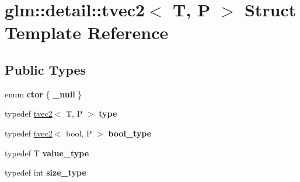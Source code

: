 \hypertarget{structglm_1_1detail_1_1tvec2}{\section{glm\-:\-:detail\-:\-:tvec2$<$ T, P $>$ Struct Template Reference}
\label{structglm_1_1detail_1_1tvec2}
}
\subsection*{Public Types}
\begin{DoxyCompactItemize}
\item 
enum {\bfseries ctor} \{ {\bfseries \-\_\-null}
 \}
\item 
\hypertarget{structglm_1_1detail_1_1tvec2_a644c796a3f1da08b7481ca69fbd10818}{typedef \hyperlink{structglm_1_1detail_1_1tvec2}{tvec2}$<$ T, P $>$ {\bfseries type}}\label{structglm_1_1detail_1_1tvec2_a644c796a3f1da08b7481ca69fbd10818}

\item 
\hypertarget{structglm_1_1detail_1_1tvec2_af7537fd9a8c9dae6b92100b609eb2aaf}{typedef \hyperlink{structglm_1_1detail_1_1tvec2}{tvec2}$<$ bool, P $>$ {\bfseries bool\-\_\-type}}\label{structglm_1_1detail_1_1tvec2_af7537fd9a8c9dae6b92100b609eb2aaf}

\item 
\hypertarget{structglm_1_1detail_1_1tvec2_ab8ccd2ae98b414376608059114f5af41}{typedef T {\bfseries value\-\_\-type}}\label{structglm_1_1detail_1_1tvec2_ab8ccd2ae98b414376608059114f5af41}

\item 
\hypertarget{structglm_1_1detail_1_1tvec2_a66667d9497ad5c7ff1b60bafa9fb9592}{typedef int {\bfseries size\-\_\-type}}\label{structglm_1_1detail_1_1tvec2_a66667d9497ad5c7ff1b60bafa9fb9592}

\end{DoxyCompactItemize}
